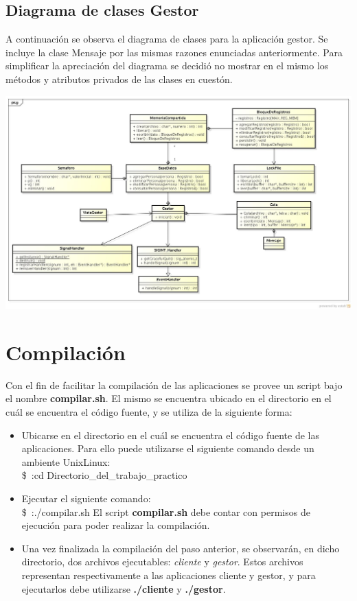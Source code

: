 \documentclass[11pt]{article}
\begin{document}
\subsection{Diagrama de clases Gestor}
A continuaci\'on se observa el diagrama de clases para la aplicaci\'on gestor. Se incluye la clase Mensaje por las mismas razones enunciadas anteriormente.
Para simplificar la apreciaci\'on del diagrama se decidi\'o no mostrar en el mismo los m\'etodos y atributos privados de las clases en cuest\'on.

\begin{center}
\includegraphics[scale=0.45, height=0.93\textheight,width=1.02\textwidth]{ClasesGestor} 
\end{center}

\newpage
\section{Compilaci\'on}
Con el fin de facilitar la compilaci\'on de las aplicaciones se provee un script bajo el nombre {\bf compilar.sh}. El mismo se encuentra ubicado en 
el directorio en el cu\'al se encuentra el c\'odigo fuente, y se utiliza de la siguiente forma:
\begin{itemize}
 \item Ubicarse en el directorio en el cu\'al se encuentra el c\'odigo fuente de las aplicaciones. Para ello puede utilizarse el siguiente 
comando desde un ambiente Unix\/Linux:\\
\$~:cd Directorio\_del\_trabajo\_practico
\item Ejecutar el siguiente comando: \\
\$~:./compilar.sh
\subitem * El script {\bf compilar.sh} debe contar con permisos de ejecuci\'on para poder realizar la compilaci\'on.
\item Una vez finalizada la compilaci\'on del paso anterior, se observar\'an, en dicho directorio, dos archivos ejecutables: \textit{cliente} y \textit{gestor}. 
Estos archivos representan respectivamente a las aplicaciones cliente y gestor, y para ejecutarlos debe utilizarse {\bf ./cliente} y {\bf ./gestor}. 
\end{itemize}
\end{document}
